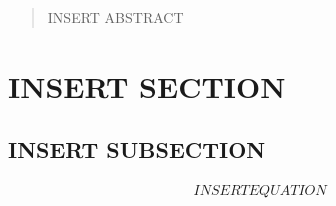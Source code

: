 \documentclass[12pt]{article}{}
\begin{document}
\maketitle

\begin{abstract}
\pagestyle{abstract}
INSERT ABSTRACT
\end{abstract}


\newpage
\clearpage
\singlespacing
\thispagestyle{plain}
\tableofcontents
\thispagestyle{plain}

\newpage
\clearpage
\singlespacing
{}
\pagestyle{document}



\newpage



\section{INSERT SECTION}


\subsection{INSERT SUBSECTION}

\begin{align}
  INSERT EQUATION
\end{align}

\end{document}
